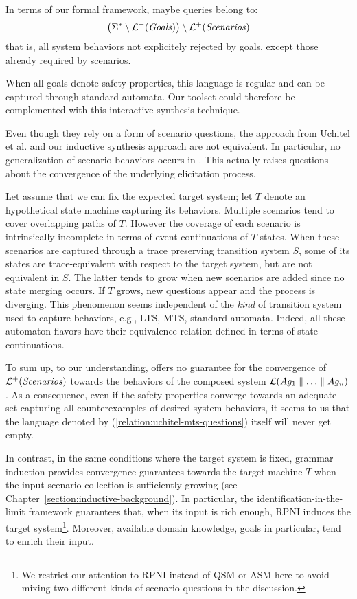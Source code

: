 In terms of our formal framework, maybe queries belong to:
\begin{align}
\left( \Sigma^* \setminus \mathcal{L}^-(\mbox{\emph{Goals}}) \right) \setminus \mathcal{L}^+(\mbox{\emph{Scenarios}})
\label{relation:uchitel-mts-questions}
\end{align}
that is, all system behaviors not explicitely rejected by goals, except those already required by scenarios.

When all goals denote safety properties, this language is regular and can be captured through standard automata. Our toolset could therefore be complemented with this interactive synthesis technique.

Even though they rely on a form of scenario questions, the approach from Uchitel et al. and our inductive synthesis approach are not equivalent. In particular, no generalization of scenario behaviors occurs in \cite{Uchitel:2007, Uchitel:2009}. This actually raises questions about the convergence of the underlying elicitation process. 

Let assume that we can fix the expected target system; let $T$ denote an hypothetical state machine capturing its behaviors. Multiple scenarios tend to cover overlapping paths of $T$. However the coverage of each scenario is intrinsically incomplete in terms of event-continuations of $T$ states. When these scenarios are captured through a trace preserving transition system $S$, some of its states are trace-equivalent with respect to the target system, but are not equivalent in $S$. The latter tends to grow when new scenarios are added since no state merging occurs. If $T$ grows, new questions appear and the process is diverging. This phenomenon seems independent of the \emph{kind} of transition system used to capture behaviors, e.g., LTS, MTS, standard automata. Indeed, all these automaton flavors have their equivalence relation defined in terms of state continuations.

To sum up, to our understanding, \cite{Uchitel:2009} offers no guarantee for the convergence of $\mathcal{L}^+(\mbox{\emph{Scenarios}})$ towards the behaviors of the composed system $\mathcal{L}(Ag_1 \parallel \ldots \parallel Ag_n)$. As a consequence, even if the safety properties converge towards an adequate set capturing all counterexamples of desired system behaviors, it seems to us that the language denoted by (\ref{relation:uchitel-mts-questions}) itself will never get empty. 

In contrast, in the same conditions where the target system is fixed, grammar induction provides convergence guarantees towards the target machine $T$ when the input scenario collection is sufficiently growing \cite{Oncina:1993} (see Chapter~\ref{section:inductive-background}). In particular, the identification-in-the-limit framework guarantees that, when its input is rich enough, RPNI induces the target system\footnote{We restrict our attention to RPNI instead of QSM or ASM here to avoid mixing two different kinds of scenario questions in the discussion.}. Moreover, available domain knowledge, goals in particular, tend to enrich their input.

